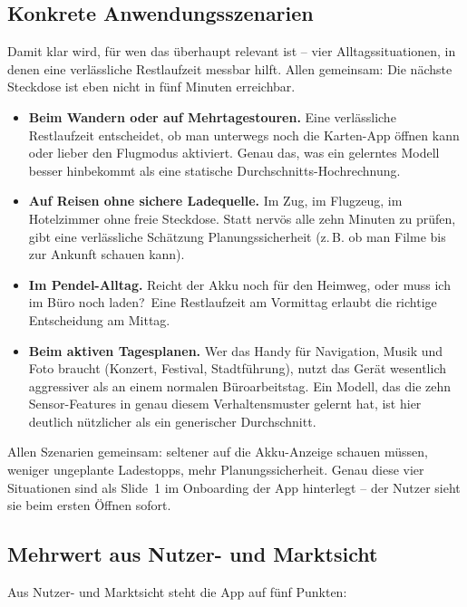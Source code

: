 \documentclass[12pt, a4paper, ngerman]{article}
\begin{document}
\subsection{Konkrete Anwendungsszenarien}
\label{sec:szenarien}

Damit klar wird, für wen das überhaupt relevant ist -- vier
Alltagssituationen, in denen eine verlässliche Restlaufzeit
messbar hilft. Allen gemeinsam: Die nächste Steckdose ist eben
nicht in fünf Minuten erreichbar.

\begin{itemize}
\item \textbf{Beim Wandern oder auf Mehrtagestouren.} Eine
  verlässliche Restlaufzeit entscheidet, ob man unterwegs noch
  die Karten-App öffnen kann oder lieber den Flugmodus aktiviert.
  Genau das, was ein gelerntes Modell besser hinbekommt als eine
  statische Durchschnitts-Hochrechnung.
\item \textbf{Auf Reisen ohne sichere Ladequelle.} Im Zug, im
  Flugzeug, im Hotelzimmer ohne freie Steckdose. Statt nervös
  alle zehn Minuten zu prüfen, gibt eine verlässliche Schätzung
  Planungssicherheit (z.\,B. ob man Filme bis zur Ankunft schauen
  kann).
\item \textbf{Im Pendel-Alltag.} \glqq{}Reicht der Akku noch für
  den Heimweg, oder muss ich im Büro noch laden?\grqq{}\ Eine
  Restlaufzeit am Vormittag erlaubt die richtige Entscheidung am
  Mittag.
\item \textbf{Beim aktiven Tagesplanen.} Wer das Handy für
  Navigation, Musik und Foto braucht (Konzert, Festival,
  Stadtführung), nutzt das Gerät wesentlich aggressiver als an
  einem normalen Büroarbeitstag. Ein Modell, das die zehn
  Sensor-Features in genau diesem Verhaltensmuster gelernt hat,
  ist hier deutlich nützlicher als ein generischer Durchschnitt.
\end{itemize}

Allen Szenarien gemeinsam: seltener auf die Akku-Anzeige schauen
müssen, weniger ungeplante Ladestopps, mehr Planungssicherheit.
Genau diese vier Situationen sind als Slide~1 im Onboarding der
App hinterlegt -- der Nutzer sieht sie beim ersten Öffnen sofort.

\newpage

\subsection{Mehrwert aus Nutzer- und Marktsicht}
\label{sec:mehrwert}

Aus Nutzer- und Marktsicht steht die App auf fünf Punkten:
\end{document}
